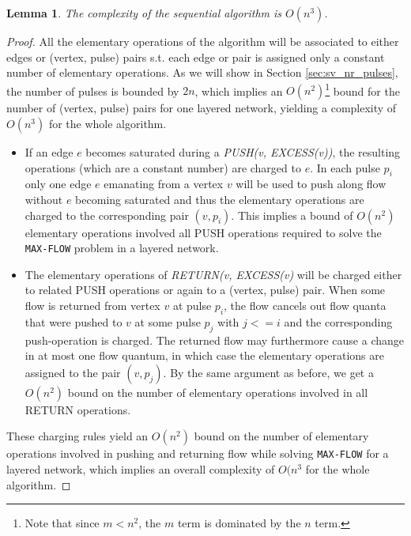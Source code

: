 \documentclass[a4paper,10pt, twocolumn]{article}
\newtheorem{lemma}{Lemma}
\begin{document}
\begin{lemma}
The complexity of the sequential algorithm is $O(n^{3})$\cite{yossi81}.
\end{lemma}
\begin{proof}
All the elementary operations of the algorithm will be associated to either edges or (vertex, pulse) pairs s.t. each edge or pair is assigned only a constant number of elementary operations. As we will show in Section \ref{sec:sv_nr_pulses}, the number of pulses is bounded by $2n$, which implies an $O(n^{2})$\footnote{Note that since $m < n^2$, the $m$ term is dominated by the $n$ term.} bound for the number of (vertex, pulse) pairs for one layered network, yielding a complexity of $O(n^{3})$ for the whole algorithm.

\begin{itemize}
	\item If an edge $e$ becomes saturated during a \emph{PUSH(v, EXCESS(v))}, the resulting operations (which are a constant number) are charged to $e$. In each pulse $p_i$ only one edge $e$ emanating from a vertex $v$ will be used to push along flow without $e$ becoming saturated and thus the elementary operations are charged to the corresponding pair $(v, p_i)$. This implies a bound of $O(n^2)$ elementary operations involved all PUSH operations required to solve the \lstinline|MAX-FLOW| problem in a layered network.
	\item The elementary operations of \emph{RETURN(v, EXCESS(v)} will be charged either to related PUSH operations or again to a (vertex, pulse) pair. When some flow is returned from vertex $v$ at pulse $p_i$, the flow cancels out flow quanta that were pushed to $v$ at some pulse $p_j$ with $j<=i$ and the corresponding push-operation is charged. The returned flow may furthermore cause a change in at most one flow quantum, in which case the elementary operations are assigned to the pair $(v, p_j)$. By the same argument as before, we get a $O(n^{2})$ bound on the number of elementary operations involved in all RETURN operations.
\end{itemize}

These charging rules yield an $O(n^{2})$ bound on the number of elementary operations involved in pushing and returning flow while solving \lstinline|MAX-FLOW| for a layered network, which implies an overall complexity of $O(n^{3}$ for the whole algorithm. 
\end{proof}
\end{document}
